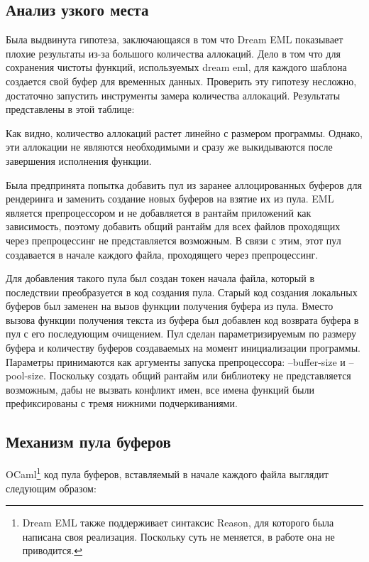 \subsection{Анализ узкого места}

Была выдвинута гипотеза, заключающаяся в том что Dream EML показывает плохие результаты из-за большого количества аллокаций.
Дело в том что для сохранения чистоты функций, используемых dream eml, для каждого шаблона создается свой буфер для временных данных.
Проверить эту гипотезу несложно, достаточно запустить инструменты замера количества аллокаций. Результаты представлены в этой таблице:


Как видно, количество аллокаций растет линейно с размером программы.
Однако, эти аллокации не являются необходимыми и сразу же выкидываются после завершения исполнения функции.

Была предпринята попытка добавить пул из заранее аллоцированных буферов для рендеринга и заменить создание новых буферов на взятие их из пула.
EML является препроцессором и не добавляется в рантайм приложений как зависимость, поэтому добавить общий рантайм для всех файлов проходящих через препроцессинг не представляется возможным.
В связи с этим, этот пул создавается в начале каждого файла, проходящего через препроцессинг.

Для добавления такого пула был создан токен начала файла, который в последствии преобразуется в код создания пула.
Старый код создания локальных буферов был заменен на вызов функции получения буфера из пула.
Вместо вызова функции получения текста из буфера был добавлен код возврата буфера в пул с его последующим очищением.
Пул сделан параметризируемым по размеру буфера и количеству буферов создаваемых на момент инициализации программы.
Параметры принимаются как аргументы запуска препроцессора: --buffer-size и --pool-size.
Поскольку создать общий рантайм или библиотеку не представляется возможным, дабы не вызвать конфликт имен, все имена функций были префиксированы с тремя нижними подчеркиваниями.

\subsection{Механизм пула буферов}

OCaml\footnote{Dream EML также поддерживает синтаксис Reason, для которого была написана своя реализация. Поскольку суть не меняется, в работе она не приводится.} код пула буферов, вставляемый в начале каждого файла выглядит следующим образом:

